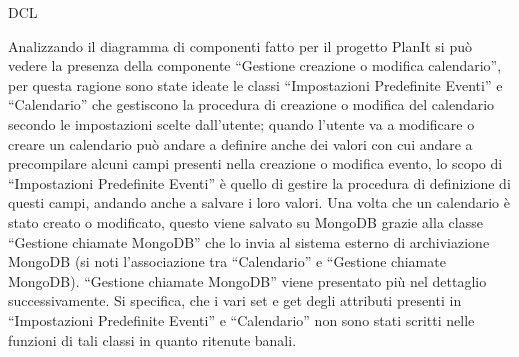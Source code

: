 \begin{listaPersonale}{DCL}
    
        \begin{center}
            
        \end{center}
    
        

    \begin{listaPersonale2}[DCL]{}

        Analizzando il diagramma di componenti fatto per il progetto PlanIt si può vedere la presenza della componente “Gestione creazione o modifica calendario”, per questa ragione sono state ideate le classi “Impostazioni Predefinite Eventi” e “Calendario”  che gestiscono la procedura di creazione o modifica del calendario secondo le impostazioni scelte dall'utente; quando l'utente va a modificare o creare un calendario può andare a definire anche dei valori con cui andare a precompilare alcuni campi presenti nella creazione o modifica evento, lo scopo di “Impostazioni Predefinite Eventi” è quello di gestire la procedura di definizione di questi campi, andando anche a salvare i loro valori. Una volta che un calendario è stato creato o modificato, questo viene salvato su MongoDB grazie alla classe “Gestione chiamate MongoDB” che lo invia al sistema esterno di archiviazione MongoDB (si noti l'associazione tra “Calendario” e “Gestione chiamate MongoDB).
        “Gestione chiamate MongoDB” viene presentato più nel dettaglio successivamente.
        Si specifica, che i vari set e get degli attributi presenti in “Impostazioni Predefinite Eventi” e “Calendario” non sono stati scritti nelle funzioni di tali classi in quanto ritenute banali.
        
        
            \begin{center}
                
            \end{center}
        

\end{listaPersonale2}
\end{listaPersonale}
